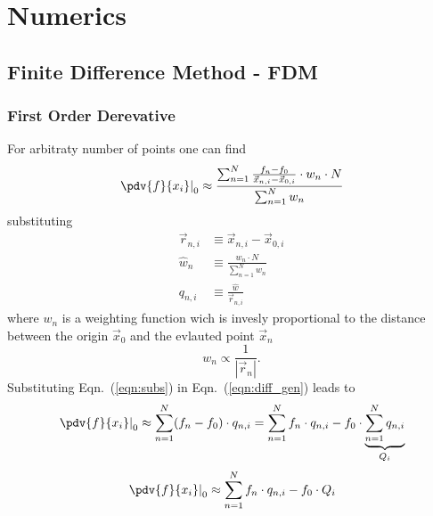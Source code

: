 \chapter{Numerics}
\section{Finite Difference Method - FDM}
\subsection{First Order Derevative}
For arbitraty number of points one can find
\begin{equation}
	\label{eqn:diff_gen}
    \left.\pdv{f}{x_i} \right|_0 \approx \frac{\sum_{n = 1}^N \frac{f_n - f_0}{\vec{x}_{n, i} - \vec{x}_{0, i}} \cdot w_n \cdot N}{\sum_{n=1}^N w_n}
\end{equation}
substituting
\begin{subequations}
	\begin{align}
		\label{eqn:subs}
		\vec{r}_{n, i} &\equiv \vec{x}_{n, i} - \vec{x}_{0, i} \\
		\hat{w}_n &\equiv \frac{w_n \cdot N}{\sum_{n=1}^N w_n} \\
		q_{n, i} &\equiv  \frac{\hat{w}}{\vec{r}_{n, i}}
	\end{align}
\end{subequations}
where $w_n$ is a weighting function wich is invesly proportional to the distance between the origin $\vec{x}_0$ and the evlauted point $\vec{x}_n$
\begin{equation}
	w_n \propto \frac{1}{|\vec{r}_{n}|}.
\end{equation}
Substituting Eqn.~(\ref{eqn:subs}) in Eqn.~(\ref{eqn:diff_gen}) leads to
\begin{equation}
	\left.\pdv{f}{x_i} \right|_0 \approx \sum_{n = 1}^N (f_n - f_0) \cdot q_{n, i} = \sum_{n = 1}^N f_n \cdot q_{n, i} - f_0 \cdot \underbrace{\sum_{n = 1}^N q_{n, i}}_{Q_i}
\end{equation}
\begin{equation}
	\label{eqn:diff}
	\left.\pdv{f}{x_i} \right|_0 \approx \sum_{n = 1}^N f_n \cdot q_{n, i} - f_0 \cdot Q_i
\end{equation}


